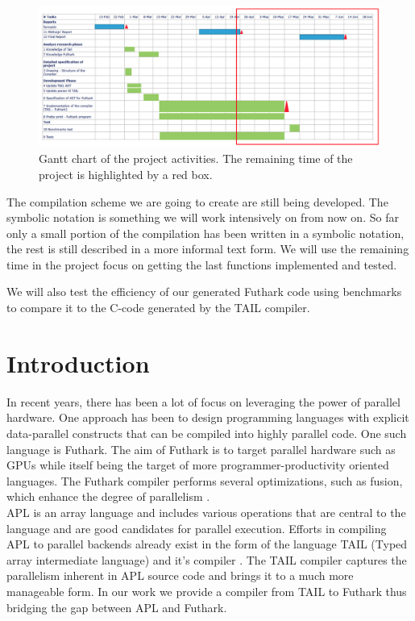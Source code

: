 \documentclass[11pt]{article}
\begin{document}
\begin{figure}%
    \centering
    \includegraphics[width=\textwidth]{midvejsgantt3.png}
    \caption{Gantt chart of the project activities. The remaining time of the project is highlighted by a red box.}
    \label{fig:gantt}
\end{figure}

The compilation scheme we are going to create are still being developed.
The symbolic notation is something we will work intensively on from now on.
So far only a small portion of the compilation has been written in a symbolic notation,
the rest is still described in a more informal text form.
We will use the remaining time in the project focus on getting the last functions implemented and tested.

We will also test the efficiency of our generated Futhark code using benchmarks to compare it to the C-code generated by the TAIL compiler. 


\newpage

\section{Introduction}

In recent years, there has been a lot of focus on leveraging the power of parallel hardware. 
One approach has been to design programming languages with explicit data-parallel constructs that can be compiled 
into highly parallel code. One such language is Futhark. The aim of Futhark is to target parallel hardware such as 
GPUs while itself being the target of more programmer-productivity oriented languages. The Futhark compiler 
performs several optimizations, such as fusion, which enhance the degree of 
parallelism \cite{T.Henriksen&C.Oancea}.\\

APL is an array language and includes various operations that are central to the language and are good candidates 
for parallel execution. Efforts in compiling APL to parallel backends already exist in the form of the language 
TAIL (Typed array intermediate language) and it’s compiler \cite{ElsmanDybdal:Array:2014}.
The TAIL compiler captures the parallelism inherent in APL source code and brings it to a much more manageable form.
In our work we provide a compiler from TAIL 
to Futhark thus bridging the gap between APL and Futhark.\\
\end{document}
